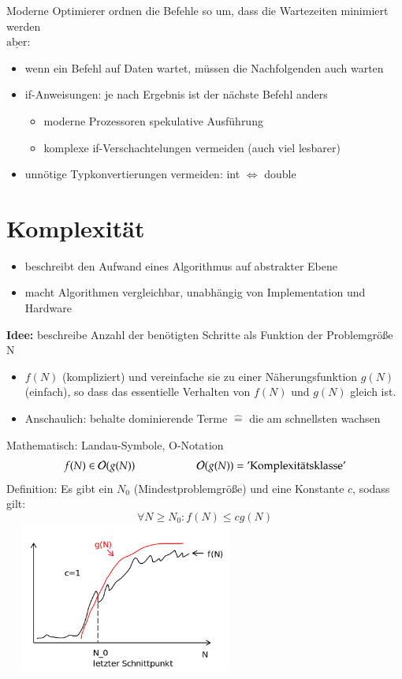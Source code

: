     \vspace*{-0.8cm}
    Moderne Optimierer ordnen die Befehle so um, dass die Wartezeiten minimiert werden\\
    $\underline{\text{aber}}$:
    \begin{itemize}
        \item wenn ein Befehl auf Daten wartet, müssen die Nachfolgenden auch warten
        \item if-Anweisungen: je nach Ergebnis ist der nächste Befehl anders
        \begin{itemize}[label={$\Rightarrow$}]
            \item moderne Prozessoren \glqq spekulative Ausführung\grqq
            \item komplexe if-Verschachtelungen vermeiden (auch viel lesbarer)
        \end{itemize}
        \item unnötige Typkonvertierungen vermeiden: int $\Leftrightarrow$ double
    \end{itemize}

\section{Komplexität}
\begin{itemize}
    \item beschreibt den Aufwand eines Algorithmus auf abstrakter Ebene
    \item macht Algorithmen vergleichbar, unabhängig von Implementation und Hardware
\end{itemize}
\textbf{Idee:} beschreibe Anzahl der benötigten Schritte als Funktion der Problemgröße N
\begin{itemize}[label={}]
    \item $f(N)$ (kompliziert) und vereinfache sie zu einer Näherungsfunktion $g(N)$ (einfach), so dass das essentielle Verhalten von $f(N)$ und $g(N)$ gleich ist.
    \item Anschaulich: behalte dominierende Terme $\widehat{=}$ die am schnellsten wachsen
\end{itemize}
Mathematisch: Landau-Symbole, \glqq O-Notation\grqq \\
\[f(N) \in \mathcal O(g(N)) \hspace*{2cm} \mathcal O(g(N)) = \text{'Komplexitätsklasse'}\]
Definition: Es gibt ein $N_0$ (Mindestproblemgröße) und eine Konstante $c$, sodass gilt:
\[\forall N \geq N_0: f(N) \leq c g(N)\]
\includegraphics[width=8cm,height=5cm,keepaspectratio]{./Pictures/Komplexitaet.png}

